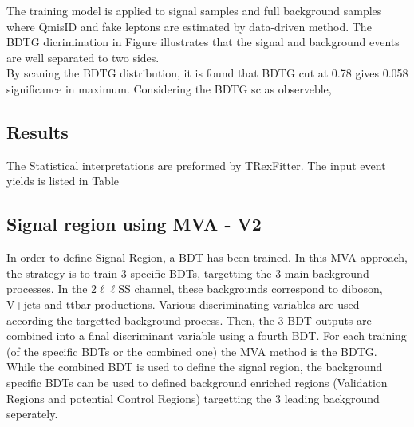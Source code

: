 The training model is applied to signal samples and full background samples where QmisID and fake leptons are estimated by data-driven method. The BDTG dicrimination in Figure illustrates that the signal and background events are well separated to two sides.\\
By scaning the BDTG distribution, it is found that BDTG cut at 0.78 gives 0.058 significance in maximum. Considering the BDTG sc as observeble, 
\subsection{Results}
The Statistical interpretations are preformed by TRexFitter. The input event yields is listed in Table

\subsection{Signal region using MVA - V2}

In order to define Signal Region, a BDT has been trained. In this MVA
approach, the strategy is to train 3 specific BDTs, targetting the 3 main
background processes. In the 2$\mathrm{\ell \ell}$SS channel, these
backgrounds correspond to diboson, V+jets and ttbar
productions. Various discriminating 
variables are used according the targetted background process. Then, the 3 BDT
outputs are combined into a final discriminant variable using a fourth
BDT. For each training (of the specific BDTs or the combined one) the MVA
method is the BDTG. 
While the combined BDT is used to define the signal region, the
background specific BDTs can be used to defined background enriched
regions (Validation Regions and potential Control Regions) targetting
the 3 leading background seperately.  

